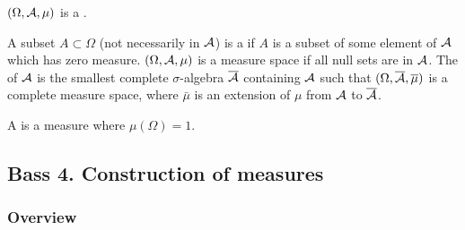 $(\Omega, \mathcal A, \mu)$ is a .

A subset $A \subset \Omega$ (not necessarily in $\mathcal A$) is a  if $A$ is a subset of some element
of $\mathcal A$ which has zero measure. $(\Omega, \mathcal A, \mu)$ is a  measure space if all null sets are
in $\mathcal A$. The  of $\mathcal A$ is the smallest complete $\sigma$-algebra $\overline{\mathcal A}$ containing
$\mathcal A$ such that $(\Omega, \overline{\mathcal A}, \overline \mu)$ is a complete measure space, where $\bar \mu$ is an
extension of $\mu$ from $\mathcal A$ to $\overline{\mathcal A}$.

A  is a measure where $\mu(\Omega) = 1$.

\subsection{Bass 4.  Construction of measures}

\subsubsection{Overview}

